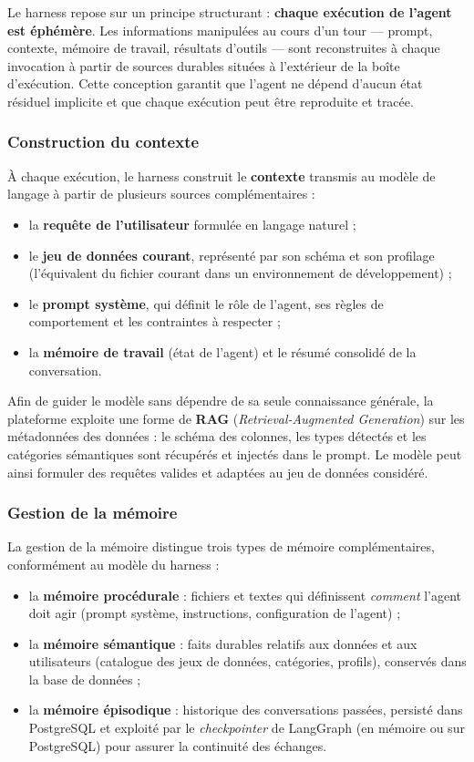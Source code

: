 Le harness repose sur un principe structurant : \textbf{chaque exécution de l'agent est éphémère}. Les informations manipulées au cours d'un tour — prompt, contexte, mémoire de travail, résultats d'outils — sont reconstruites à chaque invocation à partir de sources durables situées à l'extérieur de la boîte d'exécution. Cette conception garantit que l'agent ne dépend d'aucun état résiduel implicite et que chaque exécution peut être reproduite et tracée.

\subsubsection{Construction du contexte}

À chaque exécution, le harness construit le \textbf{contexte} transmis au modèle de langage à partir de plusieurs sources complémentaires :

\begin{itemize}
  \item la \textbf{requête de l'utilisateur} formulée en langage naturel ;
  \item le \textbf{jeu de données courant}, représenté par son schéma et son profilage (l'équivalent du fichier courant dans un environnement de développement) ;
  \item le \textbf{prompt système}, qui définit le rôle de l'agent, ses règles de comportement et les contraintes à respecter ;
  \item la \textbf{mémoire de travail} (état de l'agent) et le résumé consolidé de la conversation.
\end{itemize}

Afin de guider le modèle sans dépendre de sa seule connaissance générale, la plateforme exploite une forme de \textbf{RAG} (\textit{Retrieval-Augmented Generation}) sur les métadonnées des données : le schéma des colonnes, les types détectés et les catégories sémantiques sont récupérés et injectés dans le prompt. Le modèle peut ainsi formuler des requêtes valides et adaptées au jeu de données considéré.

\subsubsection{Gestion de la mémoire}

La gestion de la mémoire distingue trois types de mémoire complémentaires, conformément au modèle du harness :

\begin{itemize}
  \item la \textbf{mémoire procédurale} : fichiers et textes qui définissent \textit{comment} l'agent doit agir (prompt système, instructions, configuration de l'agent) ;
  \item la \textbf{mémoire sémantique} : faits durables relatifs aux données et aux utilisateurs (catalogue des jeux de données, catégories, profils), conservés dans la base de données ;
  \item la \textbf{mémoire épisodique} : historique des conversations passées, persisté dans PostgreSQL et exploité par le \textit{checkpointer} de LangGraph (en mémoire ou sur PostgreSQL) pour assurer la continuité des échanges.
\end{itemize}


